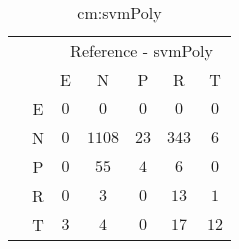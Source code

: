 \begin{table}[!ht]
	\centering
	\begin{tabular}{|c|c|c|c|c|c|c|}
		\cline{3-7}
		\multicolumn{2}{c|}{} & \multicolumn{5}{|c|}{Reference - svmPoly} \\ \cline{3-7}
		\multicolumn{2}{c|}{} & E & N & P & R & T \\ \hline
		\multirow{5}{*}{\rotatebox{90}{Prediction}} & E & $0$ & $0$ & $0$ & $0$ & $0$ \\ \cline{2-7}
		 & N & $0$ & $1108$ & $23$ & $343$ & $6$ \\ \cline{2-7}
		 & P & $0$ & $55$ & $4$ & $6$ & $0$ \\ \cline{2-7}
		 & R & $0$ & $3$ & $0$ & $13$ & $1$ \\ \cline{2-7}
		 & T & $3$ & $4$ & $0$ & $17$ & $12$ \\ \hline
	\end{tabular}
	\caption{cm:svmPoly}
	\label{tab:cm:svmPoly}
\end{table}
